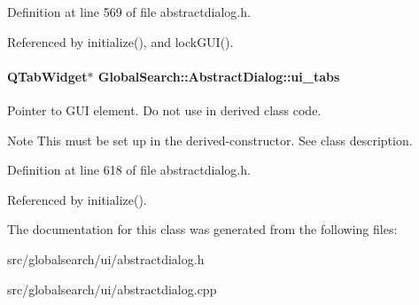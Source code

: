 Definition at line 569 of file abstractdialog.\+h.



Referenced by initialize(), and lock\+G\+U\+I().

\hypertarget{classGlobalSearch_1_1AbstractDialog_acc93d22a99eb7c11610494ce754b1502}{}
\paragraph[{ui\+\_\+tabs}]{\setlength{\rightskip}{0pt plus 5cm}Q\+Tab\+Widget$\ast$ Global\+Search\+::\+Abstract\+Dialog\+::ui\+\_\+tabs\hspace{0.3cm}{\ttfamily [protected]}}\label{classGlobalSearch_1_1AbstractDialog_acc93d22a99eb7c11610494ce754b1502}
Pointer to G\+U\+I element. Do not use in derived class code. \begin{DoxyNote}{Note}
This must be set up in the derived-\/constructor. See class description. 
\end{DoxyNote}


Definition at line 618 of file abstractdialog.\+h.



Referenced by initialize().



The documentation for this class was generated from the following files\+:\begin{DoxyCompactItemize}
\item 
src/globalsearch/ui/abstractdialog.\+h\item 
src/globalsearch/ui/abstractdialog.\+cpp\end{DoxyCompactItemize}
